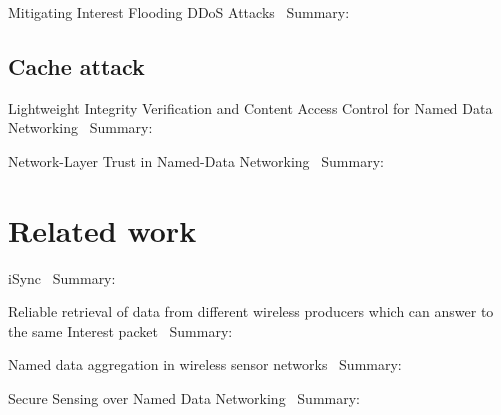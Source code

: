Mitigating Interest Flooding DDoS Attacks~\cite{DBLP:journals/corr/abs-1303-4823}
Summary:

\subsection{Cache attack}

Lightweight Integrity Verification and Content Access Control for Named Data Networking~\cite{DBLP:journals/tifs/LiZZSF15}
Summary:


Network-Layer Trust in Named-Data Networking~\cite{DBLP:journals/ccr/GhaliTU14}
Summary:


\section{Related work}
iSync~\cite{DBLP:conf/acmicn/FuAC14}
Summary:


Reliable retrieval of data from different wireless producers which can answer to the same Interest packet~\cite{DBLP:conf/acmicn/AmadeoCM14}
Summary:


Named data aggregation in wireless sensor networks~\cite{DBLP:conf/noms/AbidySLF14}
Summary:


Secure Sensing over Named Data Networking~\cite{DBLP:conf/nca/BurkeGNT14}
Summary: